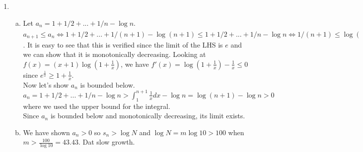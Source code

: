\documentclass{article}
\begin{document}
\begin{enumerate}
\begin{enumerate}[(a)]
\item $\displaystyle\lim_{x\rightarrow 0} \frac{\tan x - x}{x(1-\cos x)} = \displaystyle\lim_{x\rightarrow 0}\frac{\sin x - x\cos x}{x \cos x (1-\cos x)} =\displaystyle\lim_{x\rightarrow 0} \frac{\sin x - x\cos x}{x - x \cos x}=\displaystyle\lim_{x\rightarrow 0} \frac{x\sin x}{1 -  \cos x+ x \sin x}$\\
$=\displaystyle\lim_{x\rightarrow 0} \frac{\sin x + x \cos x}{2\sin x + x \cos x}=\displaystyle\lim_{x\rightarrow 0} \frac{2 \cos x-x\sin x }{3\cos x - x \sin x}=\frac{2}{3}$\\
\item $\displaystyle\lim_{x\rightarrow 0} \frac{x-\sin x}{\tan x - x} = \displaystyle\lim_{x\rightarrow 0} \frac{x\cos x-\sin x \cos x}{\sin x - x\cos x}=\displaystyle\lim_{x\rightarrow 0} \frac{x-\sin x}{\sin x - x\cos x}=\displaystyle\lim_{x\rightarrow 0} \frac{1-\cos x}{x\sin x}$\\
$=\displaystyle\lim_{x\rightarrow 0} \frac{\sin x}{\sin x+x\cos x}=\displaystyle\lim_{x\rightarrow 0}\frac{\cos x}{2\cos x- x\sin x}=\frac{1}{2}$.\\
\end{enumerate}
\setcounter{enumi}{8}
\item
\begin{enumerate}[(a)]
\item Let $a_n=1+1/2+...+1/n - \log n$. $a_{n+1} \leq a_n \Leftrightarrow 1+1/2+...+1/(n+1) - \log (n+1) \leq 1+1/2+...+1/n - \log n \Leftrightarrow 1/(n+1) \leq \log ((n+1)/n)\Leftrightarrow \left(\frac{n+1}{n}\right)^{n+1} = (1+\frac{1}{n})(1+\frac{1}{n})^n\geq e$. It is easy to see that this is verified since the limit of the LHS is $e$ and we can show that it is monotonically decreasing. Looking at $f(x) = (x+1)\log(1+\frac{1}{x})$, we have $f'(x) = \log(1+\frac{1}{x}) - \frac{1}{x}\leq 0$ since $e^{\frac{1}{x}} \geq 1 +\frac{1}{x}$. \\
Now let's show $a_n$ is bounded below. $a_n=1+1/2+...+1/n - \log n> \displaystyle\int_{1}^{n+1} \frac{1}{x} dx - \log n = \log(n+1) - \log n > 0$ where we used the upper bound for the integral. \\
Since $a_n$ is bounded below and monotonically decreasing, its limit exists.
\item  We have shown $a_n > 0$ so $s_n > \log N$ and $\log N = m\log 10> 100$ when $m > \frac{100}{\log 10} = 43.43$. Dat slow growth. 
\end{enumerate}
\end{enumerate}
\end{document}
